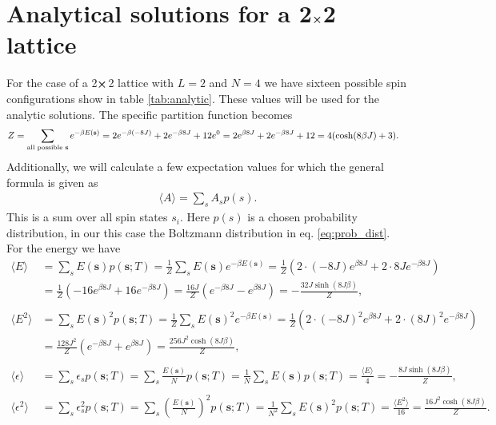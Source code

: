 \documentclass[english,notitlepage,reprint,nofootinbib]{revtex4-1}  %
\begin{document}
\section{Analytical solutions for a 2$\cross$2 lattice}\label{appendix:A}
For the case of a 2$\cross$2 lattice with $L=2$ and $N=4$ we have sixteen possible spin configurations show in table \ref{tab:analytic}. These values will be used for the analytic solutions. The specific partition function becomes
\begin{align*}
    Z &=  \sum_{\text{all possible \textbf{s}}} e^{- \beta E(\textbf{s})} 
    = 2e^{- \beta (-8J)} + 2e^{- \beta 8J} + 12e^0 
    = 2 e^{\beta 8J} + 2 e^{- \beta 8J} + 12 
    = 4 (\cosh(8 \beta J) + 3).
\end{align*}
Additionally, we will calculate a few expectation values for which the general formula is given as
\begin{align*}
    \langle A \rangle = \sum_s A_s p(s).
\end{align*}
This is a sum over all spin states $s_i$. Here $p(s)$ is a chosen probability distribution, in our this case the Boltzmann distribution in eq. \ref{eq:prob_dist}. For the energy we have
\begin{align*}
    \langle E \rangle &=  \sum_s E(\textbf{s})  p(\textbf{s};T) 
    = \frac{1}{Z} \sum_s E(\textbf{s})  e^{-\beta E(\textbf{s})} 
    = \frac{1}{Z} \left( 2 \cdot (-8J)e^{\beta8J} + 2 \cdot 8J e^{-\beta 8J}\right) \\
    &= \frac{1}{Z} \left( -16 e^{\beta8J} + 16 e^{-\beta 8J}\right)
    = \frac{16J}{Z} \left( e^{-\beta 8J} - e^{\beta 8J} \right)
    = - \frac{32 J \sinh(8J \beta )}{Z},
\\
\\
    \langle E^2 \rangle &=  \sum_s E(\textbf{s})^2  p(\textbf{s};T)
    = \frac{1}{Z} \sum_s E(\textbf{s})^2  e^{-\beta E(\textbf{s})} 
    = \frac{1}{Z} \left( 2 \cdot (-8J)^2e^{\beta8J} + 2 \cdot (8J)^2 e^{-\beta 8J}\right) \\
    &= \frac{128 J^2}{Z} \left( e^{-\beta 8J} + e^{\beta 8J} \right)
    = \frac{256 J^2 \cosh(8J \beta)}{Z},
\\
\\
    \langle \epsilon \rangle &=  \sum_s \epsilon_s  p(\textbf{s};T)
    =  \sum_s \frac{E(\textbf{s})}{N}  p(\textbf{s};T)
    =  \frac{1}{N} \sum_s E(\textbf{s})  p(\textbf{s};T)
    =  \frac{\langle E \rangle }{4}
    = - \frac{8J \sinh(8J \beta)}{Z},
\\
\\
    \langle \epsilon^2 \rangle &=  \sum_s \epsilon_s^2  p(\textbf{s};T)
    =  \sum_s \left(\frac{E(\textbf{s})}{N}\right)^2  p(\textbf{s};T) 
    =  \frac{1}{N^2} \sum_s E(\textbf{s})^2  p(\textbf{s};T)
    =  \frac{\langle E^2 \rangle }{16}
    = \frac{16 J^2 \cosh(8J \beta)}{Z}.
\end{align*}
\end{document}
